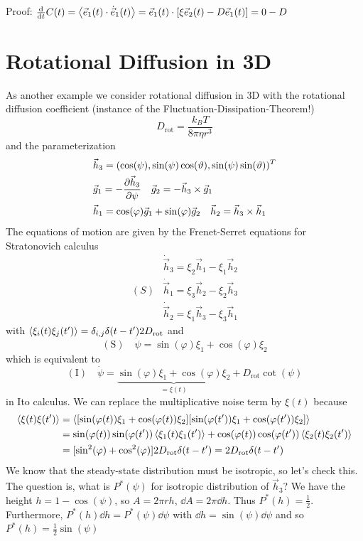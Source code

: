 \documentclass{/home/ben/Templates/notebook}
\begin{document}
	Proof: $\dv{t} C(t) = \expval{\vec{e}_1(t) \cdot \dot{\vec{e}}_1(t)} = \vec{e}_1(t) \cdot [\xi \vec{e}_2(t) - D \vec{e}_1(t)] = 0 - D$
	
	\section{Rotational Diffusion in 3D}
	
	As another example we consider rotational diffusion in 3D with the rotational diffusion coefficient (instance of the Fluctuation-Dissipation-Theorem!)
	\begin{equation}
	D_{\mathrm{rot}} = \frac{k_B T}{8 \pi \eta r^3}
	\end{equation}
	and the parameterization
	\begin{align*}
		& \vec{h}_3 = (\cos(\psi), \sin(\psi) \cos(\vartheta), \sin(\psi) \sin(\vartheta))^T \\
		& \vec{g}_1 = - \pdv{\vec{h}_3}{\psi} \quad \vec{g}_2 = - \vec{h}_3 \times \vec{g}_1 \\
		& \vec{h}_1 = \cos(\varphi) \vec{g}_1 + \sin(\varphi) \vec{g}_2 \quad \vec{h}_2 = \vec{h}_3 \times \vec{h}_1
	\end{align*}
	The equations of motion are given by the Frenet-Serret equations for Stratonovich calculus
	\begin{eqnarray*}
		& \dot{\vec{h}}_3 = \xi_2 \vec{h}_1 - \xi_1 \vec{h}_2 \\
		(S) & \dot{\vec{h}}_1 = \xi_3 \vec{h}_2 - \xi_2 \vec{h}_3 \\
		& \dot{\vec{h}}_2 =   \xi_1 \vec{h}_3 -\xi_3 \vec{h}_1
	\end{eqnarray*}
	with $\expval{\xi_i(t) \xi_j(t')} = \delta_{i,j} \delta(t-t') 2 D_{\mathrm{rot}}$ and
	\begin{equation}
	\mathrm{(S)} \quad \dot{\psi} = \sin(\varphi) \xi_1 + \cos(\varphi) \xi_2
	\end{equation}
	which is equivalent to
	\begin{equation}
	\mathrm{(I)} \quad \dot{\psi} = \underbrace{\sin(\varphi) \xi_1 + \cos(\varphi) \xi_2}_{= \xi(t)} + D_{\mathrm{rot}} \cot(\psi)
	\end{equation}
	in Ito calculus. We can replace the multiplicative noise term by $\xi(t)$ because
	\begin{align*}
		\expval{\xi(t) \xi(t')} &= \expval{[\sin(\varphi(t)) \xi_1 + \cos(\varphi(t)) \xi_2] [\sin(\varphi(t')) \xi_1 + \cos(\varphi(t')) \xi_2]} \\
		&= \sin(\varphi(t))\sin(\varphi(t')) \expval{\xi_1(t) \xi_1(t')} + \cos(\varphi(t))\cos(\varphi(t')) \expval{\xi_2(t) \xi_2(t')} \\
		&= [\sin^2(\varphi) + \cos^2(\varphi)] 2 D_{\mathrm{rot}} \delta(t-t') = 2 D_{\mathrm{rot}} \delta(t-t')
	\end{align*}
	We know that the steady-state distribution must be isotropic, so let's check this. The question is, what is $P^*(\psi)$ for isotropic distribution of $\vec{h}_3$? We have the height $h = 1- \cos(\psi)$, so $A = 2 \pi r h$, $\dd{A} = 2 \pi \dd{h}$. Thus $P^*(h) = \frac{1}{2}$. Furthermore, $P^*(h) \dd{h} = P^*(\psi) \dd{\psi}$ with $\dd{h} = \sin(\psi) \dd{\psi}$ and so $P^*(h) = \frac{1}{2} \sin(\psi)$
	
\end{document}
